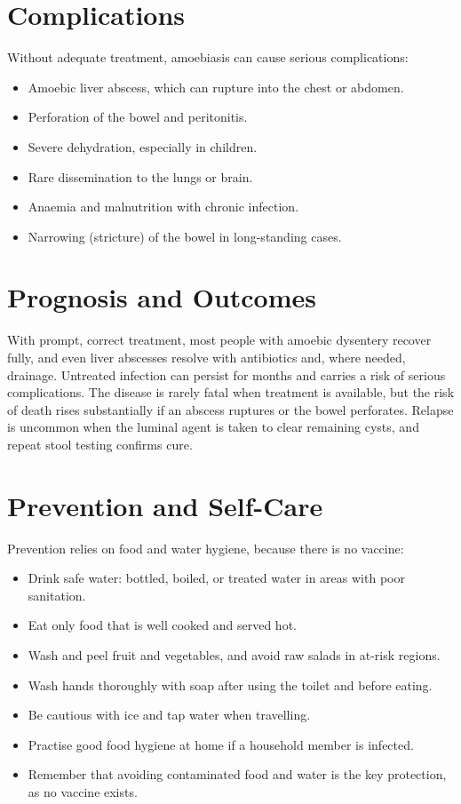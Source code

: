 \section*{Complications}
Without adequate treatment, amoebiasis can cause serious complications:

\begin{itemize}
    \item Amoebic liver abscess, which can rupture into the chest or abdomen.
    \item Perforation of the bowel and peritonitis.
    \item Severe dehydration, especially in children.
    \item Rare dissemination to the lungs or brain.
    \item Anaemia and malnutrition with chronic infection.
    \item Narrowing (stricture) of the bowel in long-standing cases.
\end{itemize}

\section*{Prognosis and Outcomes}
With prompt, correct treatment, most people with amoebic dysentery recover fully, and even liver abscesses resolve with antibiotics and, where needed, drainage. Untreated infection can persist for months and carries a risk of serious complications. The disease is rarely fatal when treatment is available, but the risk of death rises substantially if an abscess ruptures or the bowel perforates. Relapse is uncommon when the luminal agent is taken to clear remaining cysts, and repeat stool testing confirms cure.

\section*{Prevention and Self-Care}
Prevention relies on food and water hygiene, because there is no vaccine:

\begin{itemize}
    \item Drink safe water: bottled, boiled, or treated water in areas with poor sanitation.
    \item Eat only food that is well cooked and served hot.
    \item Wash and peel fruit and vegetables, and avoid raw salads in at-risk regions.
    \item Wash hands thoroughly with soap after using the toilet and before eating.
    \item Be cautious with ice and tap water when travelling.
    \item Practise good food hygiene at home if a household member is infected.
    \item Remember that avoiding contaminated food and water is the key protection, as no vaccine exists.
\end{itemize}

